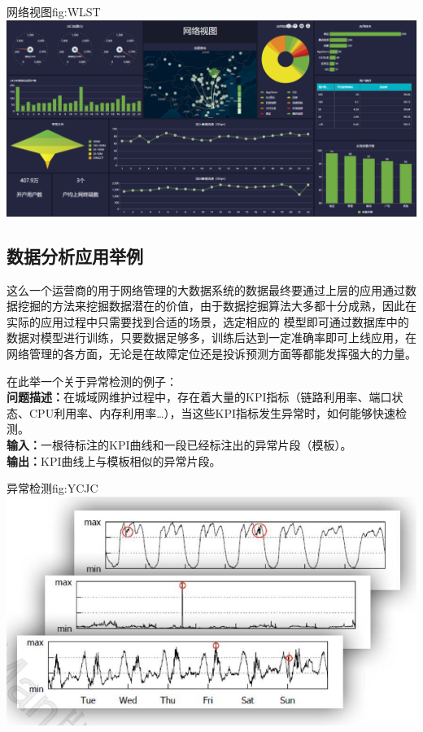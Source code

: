\documentclass{HustGraduPaper}
\begin{document}
    \begin{generalfig}{网络视图}{fig:WLST} 
        \includegraphics[width = \textwidth]{Figures/WLST.png} 
    \end{generalfig}


    \subsection{数据分析应用举例}

    这么一个运营商的用于网络管理的大数据系统的数据最终要通过上层的应用通过数据挖掘的方法来挖掘数据潜在的价值，由于数据挖掘算法大多都十分成熟，因此在实际的应用过程中只需要找到合适的场景，选定相应的
    模型即可通过数据库中的数据对模型进行训练，只要数据足够多，训练后达到一定准确率即可上线应用，在网络管理的各方面，无论是在故障定位还是投诉预测方面等都能发挥强大的力量。

    在此举一个关于异常检测的例子：\\
    {\songti \bfseries 问题描述：}在城域网维护过程中，存在着大量的KPI指标（链路利用率、端口状态、CPU利用率、内存利用率…），当这些KPI指标发生异常时，如何能够快速检测。\\
    {\songti \bfseries 输入：}一根待标注的KPI曲线和一段已经标注出的异常片段（模板）。\\
    {\songti \bfseries 输出：}KPI曲线上与模板相似的异常片段。\\

    \begin{generalfig}{异常检测}{fig:YCJC} 
        \includegraphics[width = \textwidth]{Figures/YCJC.png} 
    \end{generalfig}
\end{document}
